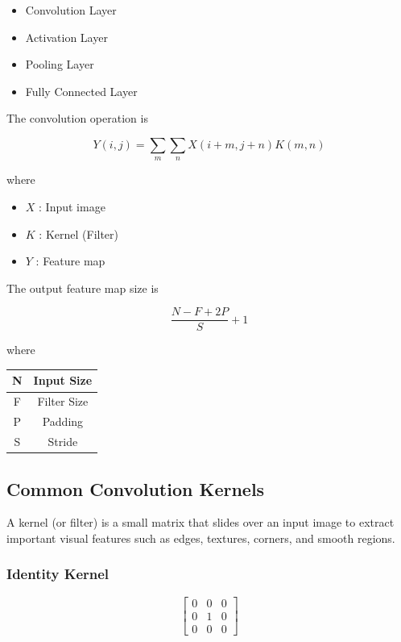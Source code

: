\documentclass[12pt,a4paper]{article}
\begin{document}
\begin{itemize}
    \item Convolution Layer
    \item Activation Layer
    \item Pooling Layer
    \item Fully Connected Layer
\end{itemize}

The convolution operation is

\[
Y(i,j)=\sum_m \sum_n X(i+m,j+n)K(m,n)
\]

where

\begin{itemize}
    \item $X$ : Input image
    \item $K$ : Kernel (Filter)
    \item $Y$ : Feature map
\end{itemize}

The output feature map size is

\[
\frac{N-F+2P}{S}+1
\]

where

\begin{center}
\begin{tabular}{|c|c|}
\hline
N & Input Size \\ \hline
F & Filter Size \\ \hline
P & Padding \\ \hline
S & Stride \\ \hline
\end{tabular}
\end{center}

\subsection{Common Convolution Kernels}

A kernel (or filter) is a small matrix that slides over an input image to extract important visual features such as edges, textures, corners, and smooth regions.

\subsubsection{Identity Kernel}

\[
\begin{bmatrix}
0&0&0\\
0&1&0\\
0&0&0
\end{bmatrix}
\]
\end{document}
